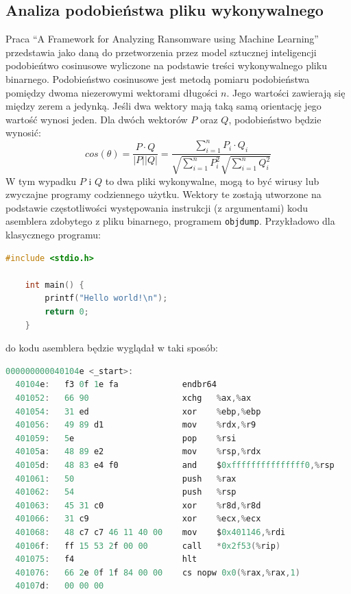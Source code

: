 \subsection{Analiza podobieństwa pliku wykonywalnego}
Praca \foreignquote{english}{A Framework for Analyzing Ransomware using
Machine Learning}~\cite{8628743} przedstawia jako daną do przetworzenia 
przez model sztucznej inteligencji podobieńtwo cosinusowe wyliczone na 
podstawie treści wykonywalnego pliku binarnego. Podobieństwo cosinusowe
jest metodą pomiaru podobieństwa pomiędzy dwoma niezerowymi wektorami długości $n$.
Jego wartości zawierają się między zerem a jedynką. Jeśli dwa wektory mają taką samą
orientację jego wartość wynosi jeden. Dla dwóch wektorów $P$ oraz $Q$, podobieństwo 
będzie wynosić:
$$
cos(\theta) = \frac{P \cdot Q}{|P||Q|} = \frac{\sum_{i = 1}^{n} P_{i} \cdot Q_{i}}{\sqrt{\sum_{i = 1}^{n}P^{2}_{i}} \sqrt{\sum_{i = 1}^{n}Q^{2}_{i}}}
$$
W tym wypadku $P$ i  $Q$ to dwa pliki wykonywalne, mogą to być wirusy lub zwyczajne programy codziennego użytku. Wektory te zostają utworzone na 
podstawie częstotliwości występowania instrukcji (z argumentami) kodu asemblera zdobytego z pliku binarnego, programem
\texttt{objdump}. Przykładowo dla klasycznego programu:
\begin{lstlisting}[language=C,
    backgroundcolor=\color{EEGold!5!white},
    caption={Elementarny program w C.},
    label={lst:ello}]
    #include <stdio.h>

    int main() {
        printf("Hello world!\n");
        return 0;
    }
\end{lstlisting}
do kodu asemblera będzie wyglądał w taki sposób:
\begin{lstlisting}[language=C,
    backgroundcolor=\color{EEGold!5!white},
    caption={Fragment asemblerowego kodu programu z listingu 3.},
    label={lst:ello2}]
000000000040104e <_start>:
  40104e:	f3 0f 1e fa          	endbr64
  401052:	66 90                	xchg   %ax,%ax
  401054:	31 ed                	xor    %ebp,%ebp
  401056:	49 89 d1             	mov    %rdx,%r9
  401059:	5e                   	pop    %rsi
  40105a:	48 89 e2             	mov    %rsp,%rdx
  40105d:	48 83 e4 f0          	and    $0xfffffffffffffff0,%rsp
  401061:	50                   	push   %rax
  401062:	54                   	push   %rsp
  401063:	45 31 c0             	xor    %r8d,%r8d
  401066:	31 c9                	xor    %ecx,%ecx
  401068:	48 c7 c7 46 11 40 00 	mov    $0x401146,%rdi
  40106f:	ff 15 53 2f 00 00    	call   *0x2f53(%rip) 
  401075:	f4                   	hlt
  401076:	66 2e 0f 1f 84 00 00 	cs nopw 0x0(%rax,%rax,1)
  40107d:	00 00 00 
\end{lstlisting}
